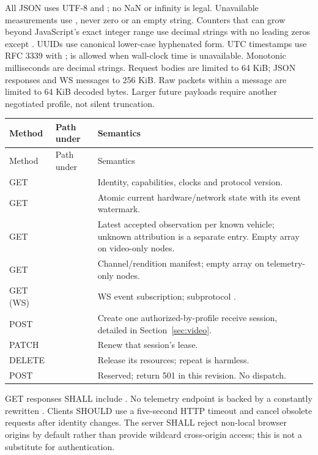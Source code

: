 All JSON uses UTF-8 and ; no NaN or infinity is legal.
Unavailable measurements use , never zero or an empty string.
Counters that can grow beyond JavaScript's exact integer range use decimal
strings with no leading zeros except . UUIDs use canonical lower-case
hyphenated form. UTC timestamps use RFC 3339 with ;  is allowed
when wall-clock time is unavailable. Monotonic milliseconds are decimal strings.
Request bodies are limited to 64 KiB; JSON responses and WS messages to 256 KiB.
Raw packets within a message are limited to 64 KiB decoded bytes. Larger future
payloads require another negotiated profile, not silent truncation.

\begin{longtable}{L{19mm}L{61mm}L{80mm}}
\toprule Method & Path under  & Semantics\\\midrule
\endfirsthead
\toprule Method & Path under  & Semantics\\\midrule
\endhead
GET &  & Identity, capabilities, clocks and protocol version.\\
GET &  & Atomic current hardware/network state with its event watermark.\\
GET &  & Latest accepted observation per known vehicle; unknown attribution is a separate entry. Empty array on video-only nodes.\\
GET &  & Channel/rendition manifest; empty array on telemetry-only nodes.\\
GET (WS) &  & WS event subscription; subprotocol .\\
POST &  & Create one authorized-by-profile receive session, detailed in Section~\ref{sec:video}.\\
PATCH &  & Renew that session's lease.\\
DELETE &  & Release its resources; repeat is harmless.\\
POST &  & Reserved; return 501  in this revision. No dispatch.\\
\bottomrule
\end{longtable}

GET responses SHALL include . No telemetry endpoint
is backed by a constantly rewritten . Clients SHOULD use a
five-second HTTP timeout and cancel obsolete requests after identity changes.
The server SHALL reject non-local browser origins by default rather than provide
wildcard cross-origin access; this is not a substitute for authentication.

